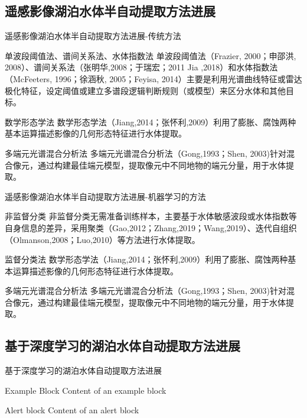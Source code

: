 \documentclass[10pt,aspectratio=169]{beamer} %
\begin{document}
	\subsection{遥感影像湖泊水体半自动提取方法进展}
	\begin{frame}[c]{遥感影像湖泊水体半自动提取方法进展-传统方法}
		
		\begin{block}{单波段阈值法、谱间关系法、水体指数法}
			单波段阈值法（Frazier, 2000；申邵洪, 2008）、谱间关系法（张明华,2008；于瑞宏；2011 Jia ,2018）和水体指数法（McFeeters, 1996；徐涵秋, 2005；Feyisa, 2014）主要是利用光谱曲线特征或雷达极化特征，设定阈值或建立多谱段逻辑判断规则（或模型）来区分水体和其他目标。
		\end{block}
		\begin{block}{数学形态学法}
			数学形态学法（Jiang,2014；张怀利,2009）利用了膨胀、腐蚀两种基本运算描述影像的几何形态特征进行水体提取。
		\end{block}
		\begin{block}{多端元光谱混合分析法}
			多端元光谱混合分析法（Gong,1993；Shen, 2003)针对混合像元，通过构建最佳端元模型，提取像元中不同地物的端元分量，用于水体提取。
		\end{block}
	\end{frame}
	
	\begin{frame}[c]{遥感影像湖泊水体半自动提取方法进展-机器学习的方法}
		
		\begin{block}{非监督分类}
			非监督分类无需准备训练样本，主要基于水体敏感波段或水体指数等自身信息的差异，采用聚类（Gao,2012；Zhang,2019；Wang,2019）、迭代自组织（Olmanson,2008；Luo,2010）等方法进行水体提取。
		\end{block}
		\begin{block}{监督分类法}
			数学形态学法（Jiang,2014；张怀利,2009）利用了膨胀、腐蚀两种基本运算描述影像的几何形态特征进行水体提取。
		\end{block}
		\begin{block}{多端元光谱混合分析法}
			多端元光谱混合分析法（Gong,1993；Shen, 2003)针对混合像元，通过构建最佳端元模型，提取像元中不同地物的端元分量，用于水体提取。
		\end{block}
	\end{frame}
	\subsection{基于深度学习的湖泊水体自动提取方法进展}
	\begin{frame}{基于深度学习的湖泊水体自动提取方法进展}
		\begin{exampleblock}{Example Block}
			Content of an example block
		\end{exampleblock}
		
		\begin{alertblock}{Alert block}
			Content of an alert block
		\end{alertblock}
	\end{frame}
\end{document}
